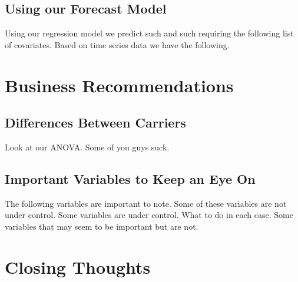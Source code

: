 \documentclass[12pt, a4paper, openany]{book}
\newcommand\tab[1][1cm]{\hspace*{#1}}
\begin{document}
	\section{Using our Forecast Model}
	\tab Using our regression  model we predict  such and such requiring the following list of covariates. Based on time series data we have the following.
\chapter{Business Recommendations}
	\section{Differences Between Carriers}
	\tab Look at our ANOVA. Some of you guys suck.
	\section{Important Variables to Keep an Eye On}
	\tab The following variables are important to note. Some of these variables are not under control. Some variables are under control. What to do in each case. Some variables that may seem to be important but are not.
\chapter{Closing Thoughts}
\end{document}
